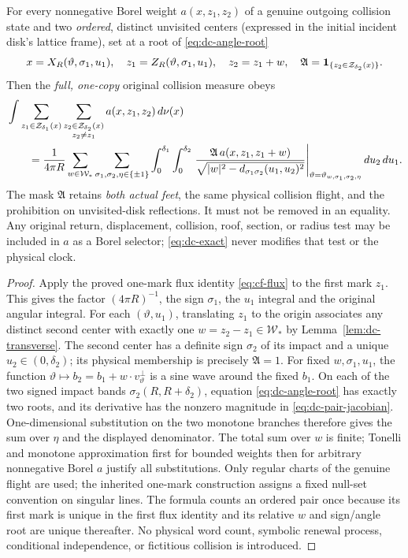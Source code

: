 \begin{theorem}
\label{thm:dc-exact}
For every nonnegative Borel weight $a(x,z_1,z_2)$ of a genuine
outgoing collision state and two \emph{ordered}, distinct unvisited
centers (expressed in the initial incident disk's lattice frame),
set at a root of \eqref{eq:dc-angle-root}
\[
 x=X_R(\vartheta,\sigma_1,u_1),\quad
 z_1=Z_R(\vartheta,\sigma_1,u_1),\quad z_2=z_1+w,
 \quad
 \mathfrak A=\mathbf1_{\{z_2\in\mathcal Z_{\delta_2}(x)\}}.
\]
Then the \emph{full, one-copy} original collision measure obeys
\begin{align}\label{eq:dc-exact}
 &\int\sum_{z_1\in\mathcal Z_{\delta_1}(x)}
       \sum_{\substack{z_2\in\mathcal Z_{\delta_2}(x)\\ z_2\ne z_1}}
         a(x,z_1,z_2)\,d\nu(x)\\
 &\qquad=\frac1{4\pi R}
 \sum_{w\in\mathcal W_*}
 \sum_{\sigma_1,\sigma_2,\eta\in\{\pm1\}}
 \int_0^{\delta_1}\int_0^{\delta_2}
  \left.
   \frac{\mathfrak A\,a(x,z_1,z_1+w)}
        {\sqrt{|w|^2-d_{\sigma_1\sigma_2}(u_1,u_2)^2}}
  \right|_{\vartheta=\vartheta_{w,\sigma_1,\sigma_2,\eta}}
   du_2\,du_1.\notag
\end{align}
The mask $\mathfrak A$ retains \emph{both actual feet}, the same
physical collision flight, and the prohibition on unvisited-disk
reflections.  It must not be removed in an equality.  Any original
return, displacement, collision, roof, section, or radius test may
be included in $a$ as a Borel selector; \eqref{eq:dc-exact}
never modifies that test or the physical clock.
\end{theorem}
\begin{proof}
Apply the proved one-mark flux identity
\eqref{eq:cf-flux} to the first mark $z_1$.  This gives the factor
$(4\pi R)^{-1}$, the sign $\sigma_1$, the $u_1$ integral and the
original angular integral.  For each $(\vartheta,u_1)$, translating
$z_1$ to the origin associates any distinct second center with
exactly one $w=z_2-z_1\in\mathcal W_*$ by
Lemma~\ref{lem:dc-transverse}.  The second center has a definite
sign $\sigma_2$ of its impact and a unique $u_2\in(0,\delta_2)$;
its physical membership is precisely $\mathfrak A=1$.
For fixed $w,\sigma_1,u_1$, the function
$\vartheta\mapsto b_2=b_1+w\cdot v_\vartheta^\perp$ is a sine wave
around the fixed $b_1$.  On each of the two signed impact bands
$\sigma_2(R,R+\delta_2)$, equation \eqref{eq:dc-angle-root} has
exactly two roots, and its derivative has the nonzero magnitude
in \eqref{eq:dc-pair-jacobian}.  One-dimensional substitution on
the two monotone branches therefore gives the sum over $\eta$ and
the displayed denominator.  The total sum over $w$ is finite;
Tonelli and monotone approximation first for bounded weights then
for arbitrary nonnegative Borel $a$ justify all substitutions.
Only regular charts of the genuine flight are used; the inherited
one-mark construction assigns a fixed null-set convention on
singular lines.  The formula counts an ordered pair once because
its first mark is unique in the first flux identity and its
relative $w$ and sign/angle root are unique thereafter.  No
physical word count, symbolic renewal process, conditional
independence, or fictitious collision is introduced.
\end{proof}

